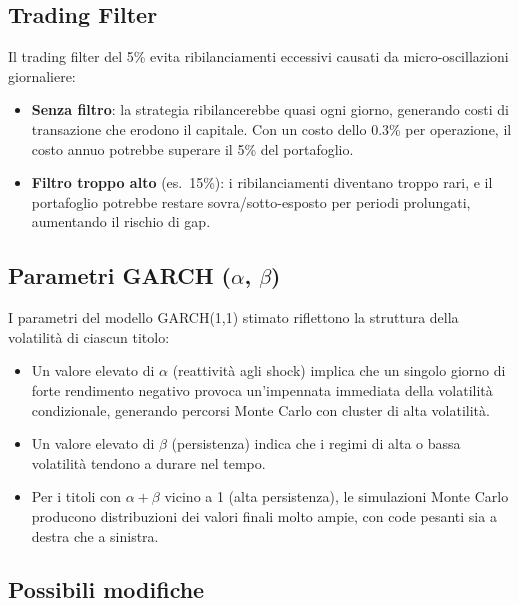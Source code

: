 \documentclass[11pt, a4paper]{report} %
\begin{document}
\subsection{Trading Filter}

Il trading filter del 5\% evita ribilanciamenti eccessivi causati da micro-oscillazioni giornaliere:
\begin{itemize}
    \item \textbf{Senza filtro}: la strategia ribilancerebbe quasi ogni giorno, generando costi di transazione che erodono il capitale.  Con un costo dello 0.3\% per operazione, il costo annuo potrebbe superare il 5\% del portafoglio.
    \item \textbf{Filtro troppo alto} (es.\ 15\%): i ribilanciamenti diventano troppo rari, e il portafoglio potrebbe restare sovra/sotto-esposto per periodi prolungati, aumentando il rischio di gap.
\end{itemize}

\subsection{Parametri GARCH ($\alpha$, $\beta$)}

I parametri del modello GARCH(1,1) stimato riflettono la struttura della volatilità di ciascun titolo:
\begin{itemize}
    \item Un valore elevato di $\alpha$ (reattività agli shock) implica che un singolo giorno di forte rendimento negativo provoca un'impennata immediata della volatilità condizionale, generando percorsi Monte Carlo con cluster di alta volatilità.
    \item Un valore elevato di $\beta$ (persistenza) indica che i regimi di alta o bassa volatilità tendono a durare nel tempo.
    \item Per i titoli con $\alpha + \beta$ vicino a 1 (alta persistenza), le simulazioni Monte Carlo producono distribuzioni dei valori finali molto ampie, con code pesanti sia a destra che a sinistra.
\end{itemize}

\subsection{Possibili modifiche}
\end{document}
